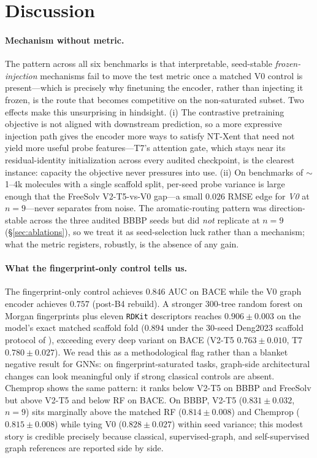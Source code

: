 \documentclass[sigconf,nonacm,anonymous,review]{acmart}
\begin{document}
\section{Discussion}
\label{sec:discussion}

\paragraph{Mechanism without metric.}
The pattern across all six benchmarks is that interpretable, seed-stable \emph{frozen-injection} mechanisms fail to move the test metric once a matched V0 control is present---which is precisely why finetuning the encoder, rather than injecting it frozen, is the route that becomes competitive on the non-saturated subset. Two effects make this unsurprising in hindsight. (i) The contrastive pretraining objective is not aligned with downstream prediction, so a more expressive injection path gives the encoder more ways to satisfy NT-Xent that need not yield more useful probe features---T7's attention gate, which stays near its residual-identity initialization across every audited checkpoint, is the clearest instance: capacity the objective never pressures into use. (ii) On benchmarks of $\sim$1--4k molecules with a single scaffold split, per-seed probe variance is large enough that the FreeSolv V2-T5-vs-V0 gap---a small $0.026$ RMSE edge for \emph{V0} at $n{=}9$---never separates from noise. The aromatic-routing pattern was direction-stable across the three audited BBBP seeds but did \emph{not} replicate at $n{=}9$ (\S\ref{sec:ablations}), so we treat it as seed-selection luck rather than a mechanism; what the metric registers, robustly, is the absence of any gain.

\paragraph{What the fingerprint-only control tells us.}
The fingerprint-only control achieves $0.846$ AUC on BACE while the V0 graph encoder achieves $0.757$ (post-B4 rebuild). A stronger 300-tree random forest on Morgan fingerprints plus eleven \texttt{RDKit} descriptors reaches $0.906 \pm 0.003$ on the model's exact matched scaffold fold ($0.894$ under the 30-seed Deng2023 scaffold protocol of \citet{deng2023systematic}), exceeding every deep variant on BACE (V2-T5 $0.763 \pm 0.010$, T7 $0.780 \pm 0.027$). We read this as a methodological flag rather than a blanket negative result for GNNs: on fingerprint-saturated tasks, graph-side architectural changes can look meaningful only if strong classical controls are absent. Chemprop \citep{yang2019chemprop} shows the same pattern: it ranks below V2-T5 on BBBP and FreeSolv but above V2-T5 and below RF on BACE. On BBBP, V2-T5 ($0.831 \pm 0.032$, $n{=}9$) sits marginally above the matched RF ($0.814 \pm 0.008$) and Chemprop ($0.815 \pm 0.008$) while tying V0 ($0.828 \pm 0.027$) within seed variance; this modest story is credible precisely because classical, supervised-graph, and self-supervised graph references are reported side by side.
\end{document}
